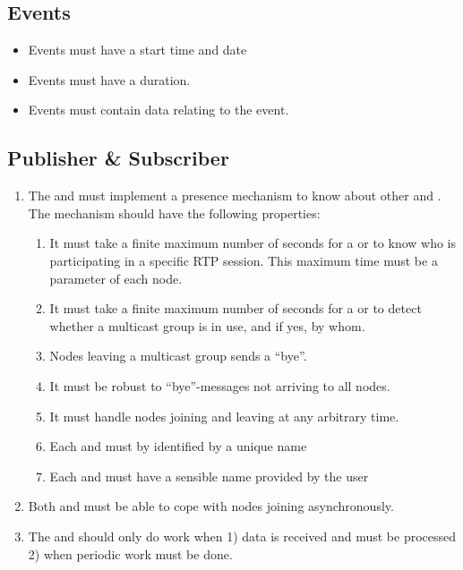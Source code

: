 \subsection{Events}
\begin{itemize}
	\item Events must have a start time and date
	\item Events must have a duration.
	\item Events must contain data relating to the event.
\end{itemize}

\subsection{Publisher \& Subscriber}
\begin{enumerate}
		\item The  and  must implement a presence mechanism to know about other  and . The mechanism should have the following properties:
	\begin{enumerate}
		\item It must take a finite maximum number of seconds for a  or  to know who is participating in a specific RTP session. This maximum time must be a parameter of each node.
		\item It must take a finite maximum number of seconds for a  or  to detect whether a multicast group is in use, and if yes, by whom.
		\item Nodes leaving a multicast group sends a ``bye''.
		\item It must be robust to ``bye''-messages not arriving to all nodes.
		\item It must handle nodes joining and leaving at any arbitrary time.
		\item Each \pub{} and \sub{} must by identified by a unique name
 		\item Each \pub{} and \sub{} must have a sensible name provided by the user
	\end{enumerate}
	\item Both  and  must be able to cope with nodes joining asynchronously.
	\item The \pubs and \subs should only do work when 1) data is received and must be processed 2) when periodic work must be done.
\end{enumerate}


